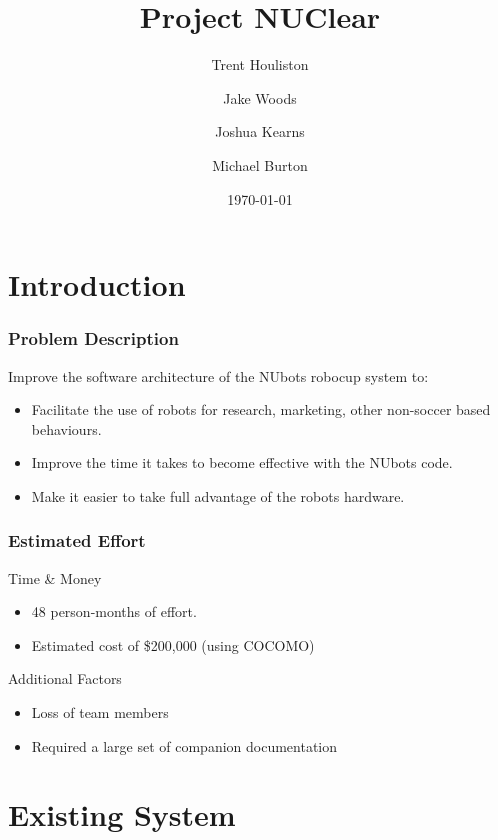 \documentclass{beamer}
\title[Short title]{Project NUClear}
\author{
	Trent Houliston \and Jake Woods \and Joshua Kearns \and Michael Burton
}
\institute[UoN]
{
	University of Newcastle \\ %
	\medskip
	\textit{\{Trent.Houliston, Jake.F.Woods, Joshua.Kearns, Michael Burton\}@uon.edu.au} %
}
\date{\today}
\begin{document}
\begin{frame} %
	\titlepage %
\end{frame}


\section{Introduction}
\begin{frame}
	\frametitle{Problem Description}
		Improve the software architecture of the NUbots robocup system to:
		\begin{itemize}
			\item Facilitate the use of robots for research, marketing, other non-soccer based behaviours.
			\item Improve the time it takes to become effective with the NUbots code.
			\item Make it easier to take full advantage of the robots hardware.
		\end{itemize}
\end{frame}

\begin{frame}
	\frametitle{Estimated Effort}
		Time \& Money
		\begin{itemize}
			\item 48 person-months of effort.
			\item Estimated cost of \$200,000 (using COCOMO)
		\end{itemize}
		
		Additional Factors
		\begin{itemize}
			\item Loss of team members
			\item Required a large set of companion documentation
		\end{itemize}
\end{frame}

\section{Existing System}
\begin{frame}
	\sectionpage
\end{frame}
\end{document}
